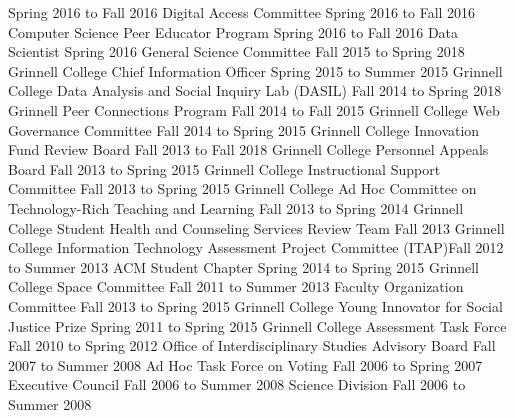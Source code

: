 \begin{cventries}
  {Spring 2016 to Fall 2016}
  {Digital Access Committee}
  {Spring 2016 to Fall 2016}
  {Computer Science Peer Educator Program}
  {Spring 2016 to Fall 2016}
  {Data Scientist}
  {Spring 2016}
  {General Science Committee}
  {Fall 2015 to Spring 2018}
  {Grinnell College Chief Information Officer}
  {Spring 2015 to Summer 2015}
  {Grinnell College Data Analysis and Social Inquiry Lab (DASIL)}
  {Fall 2014 to Spring 2018}
  {Grinnell Peer Connections Program}
  {Fall 2014 to Fall 2015}
  {Grinnell College Web Governance Committee}
  {Fall 2014 to Spring 2015}
  {Grinnell College Innovation Fund Review Board}
  {Fall 2013 to Fall 2018}
  {Grinnell College Personnel Appeals Board}
  {Fall 2013 to Spring 2015}
  {Grinnell College Instructional Support Committee}
  {Fall 2013 to Spring 2015}
  {Grinnell College Ad Hoc Committee on Technology-Rich Teaching and Learning}
  {Fall 2013 to Spring 2014}
  {Grinnell College Student Health and Counseling Services Review Team}
  {Fall 2013}
  {Grinnell College Information Technology Assessment Project Committee (ITAP)}{Fall 2012 to Summer 2013}
  {ACM Student Chapter}
  {Spring 2014 to Spring 2015}
  {Grinnell College Space Committee}
  {Fall 2011 to Summer 2013}
  {Faculty Organization Committee}
  {Fall 2013 to Spring 2015}
  {Grinnell College Young Innovator for Social Justice Prize}
  {Spring 2011 to Spring 2015}
  {Grinnell College Assessment Task Force}
  {Fall 2010 to Spring 2012}
  {Office of Interdisciplinary Studies Advisory Board}
  {Fall 2007 to Summer 2008}
  {Ad Hoc Task Force on Voting}
  {Fall 2006 to Spring 2007}
  {Executive Council}
  {Fall 2006 to Summer 2008}
  {Science Division}
  {Fall 2006 to Summer 2008}

\end{cventries}
